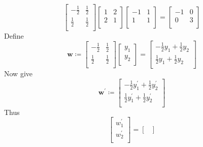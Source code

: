 \begin{solution}
\[        \begin{bmatrix}
            -\frac{1}{2} &\frac{1}{2}   \\
             \frac{1}{2}&\frac{1}{2}   \\
        \end{bmatrix} \begin{bmatrix}
            1 &2   \\
             2&1   \\
        \end{bmatrix} \begin{bmatrix}
            -1 &1   \\
             1&1   \\
        \end{bmatrix} = \begin{bmatrix}
           -1  &0   \\
             0&3   \\
        \end{bmatrix}
    \]
    Define
    \[
        \mathbf{w} \coloneqq \begin{bmatrix}
            -\frac{1}{2} &\frac{1}{2}   \\
             \frac{1}{2}&\frac{1}{2}   \\
        \end{bmatrix} \begin{bmatrix}
             y_1 \\
             y_2 \\
        \end{bmatrix} = \begin{bmatrix}
             -\frac{1}{2}y_1 + \frac{1}{2}y_2 \\
              \frac{1}{2}y_1 + \frac{1}{2}y_2\\
        \end{bmatrix}
    \]
    Now give
    \[
        \mathbf{w} ^{\prime} \coloneqq \begin{bmatrix}
             -\frac{1}{2}y_1^{\prime} +\frac{1}{2}y_2^{\prime}  \\
              \frac{1}{2}y_1^{\prime} +\frac{1}{2}y_2^{\prime} \\
        \end{bmatrix}
    \]
    Thus
    \[
        \begin{bmatrix}
             w_1^{\prime}  \\
              w_2^{\prime} \\
        \end{bmatrix} = \begin{bmatrix}

\end{bmatrix}\]
\end{solution}
